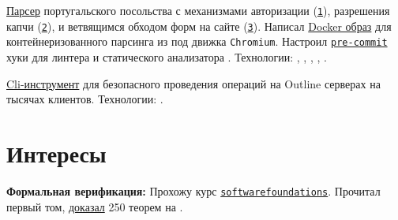 \documentclass[margin,line]{resume}
\begin{document}
\begin{resume}
\begin{description}
\begin{list2}
        \item{
            \href{https://github.com/alchemmist/portu-hack}{Парсер}
            португальского посольства с механизмами авторизации
            (\href{https://github.com/alchemmist/portu-hack/blob/develop/parser/parser/searcher/auth.py}{\texttt{1}}),
            разрешения капчи
            (\href{https://github.com/alchemmist/portu-hack/blob/develop/parser/parser/searcher/captcha.py}{\texttt{2}}),
            и
            ветвящимся обходом форм на сайте
            (\href{https://github.com/alchemmist/portu-hack/blob/develop/parser/parser/searcher/snif.py}{\texttt{3}}).
            Написал
            \href{https://github.com/alchemmist/portu-hack/blob/develop/parser/Dockerfile}{Docker
            образ} для контейнеризованного парсинга
             из под движка \texttt{Chromium}.
            Настроил
            \href{https://github.com/alchemmist/portu-hack/blob/develop/pre-commit-config.yaml}{\texttt{pre-commit}}
            хуки для линтера
             и статического анализатора .
            Технологии: , ,
            ,
            ,
          .}

          \vspace{2mm}

        \item{
            \href{https://github.com/alchemmist/outline-vpn-cli}{Cli-инструмент}
            для безопасного проведения операций на
            Outline серверах на тысячах клиентов.
          Технологии: .}
        \end{list2}

    \end{description}

    \vspace{-4mm}
    \section{\mysidestyle Интересы}\vspace{0.7mm}

    {\textbf{Формальная верификация:} Прохожу курс
      \texttt{\href{https://softwarefoundations.cis.upenn.edu}{softwarefoundations}}.
      Прочитал первый том,
      \href{https://github.com/alchemmist/coq-learning}{доказал} 250
    теорем на .} \\


\end{resume}
\end{document}
